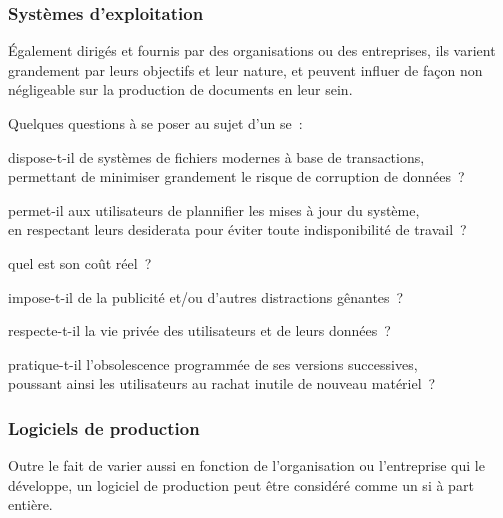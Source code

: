 \pagebreak

\subsubsection{Systèmes d’exploitation}

Également dirigés et fournis par des organisations ou des entreprises,
ils varient grandement par leurs objectifs et leur nature, et peuvent influer
de façon non négligeable sur la production de documents en leur sein.

Quelques questions à se poser au sujet d’un \gls{se} :
\begin{itmz}
\item{dispose-t-il de systèmes de fichiers modernes à base de transactions,\\
permettant de minimiser grandement le risque de corruption de données ?}
\item{permet-il aux utilisateurs de plannifier les mises à jour du système,\\
en respectant leurs desiderata pour éviter toute indisponibilité de travail ?}
\item{quel est son coût réel ?
    \begin{itmz}
    \item{impose-t-il de la publicité et/ou d’autres distractions gênantes ?}
    \item{respecte-t-il la vie privée des utilisateurs et de leurs données ?}
    \item{pratique-t-il l’obsolescence programmée de ses versions successives,\\
    poussant ainsi les utilisateurs au rachat inutile de nouveau matériel ?}
    \end{itmz}
}
\end{itmz}

\subsubsection{Logiciels de production}

Outre le fait de varier aussi en fonction de l’organisation ou l’entreprise
qui le développe, un logiciel de production peut être considéré
comme un \gls{si} à part entière.


